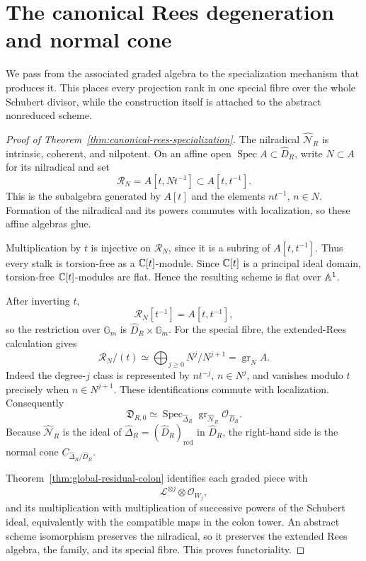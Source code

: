 \section{The canonical Rees degeneration and normal cone}
\label{sec:rees-specialization}

We pass from the associated graded algebra to the specialization
mechanism that produces it. This places every projection rank in one
special fibre over the whole Schubert divisor, while the construction
itself is attached to the abstract nonreduced scheme.

\begin{proof}[Proof of Theorem~\ref{thm:canonical-rees-specialization}]
The nilradical \(\widehat{\mathcal N}_R\) is intrinsic, coherent, and
nilpotent. On an affine open
\(\operatorname{Spec}A\subset\widehat D_R\), write \(N\subset A\)
for its nilradical and set
\[
 \mathscr R_N=A[t,Nt^{-1}]\subset A[t,t^{-1}].
\]
This is the subalgebra generated by \(A[t]\) and the elements
\(nt^{-1}\), \(n\in N\). Formation of the nilradical and its powers
commutes with localization, so these affine algebras glue.

Multiplication by \(t\) is injective on \(\mathscr R_N\), since it is
a subring of \(A[t,t^{-1}]\). Thus every stalk is torsion-free as a
\(\mathbb C[t]\)-module. Since \(\mathbb C[t]\) is a principal ideal domain,
torsion-free \(\mathbb C[t]\)-modules are flat. Hence the resulting scheme is
flat over \(\mathbb A^1\).

After inverting \(t\),
\[
 \mathscr R_N[t^{-1}]=A[t,t^{-1}],
\]
so the restriction over \(\mathbb G_m\) is
\(\widehat D_R\times\mathbb G_m\). For the special fibre, the
extended-Rees calculation gives
\[
 \mathscr R_N/(t)
 \simeq
 \bigoplus_{j\ge0}N^j/N^{j+1}
 =
 \operatorname{gr}_N A.
\]
Indeed the degree-\(j\) class is represented by \(nt^{-j}\),
\(n\in N^j\), and vanishes modulo \(t\) precisely when
\(n\in N^{j+1}\). These identifications commute with localization.
Consequently
\[
 \mathfrak D_{R,0}
 \simeq
 \operatorname{Spec}_{\widehat\Delta_R}
 \operatorname{gr}_{\widehat{\mathcal N}_R}
 \mathcal O_{\widehat D_R}.
\]
Because \(\widehat{\mathcal N}_R\) is the ideal of
\(\widehat\Delta_R=(\widehat D_R)_{\mathrm{red}}\) in
\(\widehat D_R\), the right-hand side is the normal cone
\(C_{\widehat\Delta_R/\widehat D_R}\).

Theorem~\ref{thm:global-residual-colon} identifies each graded piece
with
\[
 \mathcal L^{\otimes j}\otimes\mathcal O_{W_j},
\]
and its multiplication with multiplication of successive powers of
the Schubert ideal, equivalently with the compatible maps in the
colon tower. An abstract scheme isomorphism preserves the nilradical,
so it preserves the extended Rees algebra, the family, and its special
fibre. This proves functoriality.
\end{proof}

